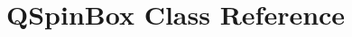 \hypertarget{classGUI_1_1QtGui_1_1QSpinBox}{}\section{Q\+Spin\+Box Class Reference}
\label{classGUI_1_1QtGui_1_1QSpinBox}
